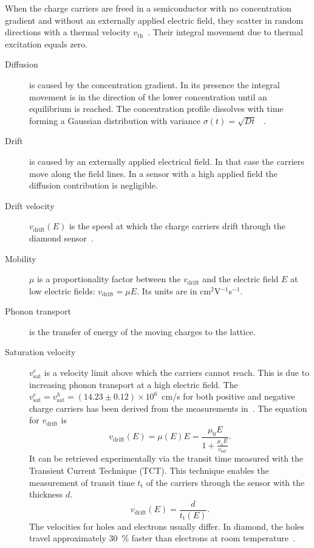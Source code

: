 When the charge carriers are freed in a semiconductor with no concentration gradient and without an externally applied electric field, they scatter in random directions with a thermal velocity $v_{\mathrm{th}}$~\cite{PHSEM:00000}. Their integral movement due to thermal excitation equals zero. 

\begin{description}

\item[Diffusion] is caused by the concentration gradient. In its presence the integral movement is in the direction of the lower concentration until an equilibrium is reached.
The concentration profile dissolves with time forming a Gaussian distribution with variance $\sigma(t)=\sqrt{Dt}$~\cite{PHSEM:00000} .

\item[Drift] is caused by an externally applied electrical field. In that case the carriers move along the field lines. In a sensor with a high applied field the diffusion contribution is negligible. 

\item[Drift velocity] $v_\mathrm{drift}(E)$ is the speed at which the charge carriers drift through the diamond sensor~\cite{PHSEM:00000}.

\item[Mobility] $\mu$ is a proportionality factor between the $v_\mathrm{drift}$ and the electric field $E$ at low electric fields: $v_\mathrm{drift} = \mu E$. Its units are in cm$^2$V$^{-1}$s$^{-1}$.

\item[Phonon transport] is the transfer of energy of the moving charges to the lattice.

\item[Saturation velocity] $v^e_\mathrm{sat}$ is a velocity limit above which the carriers cannot reach. This is due to increasing phonon transport at a high electric field. The $v^e_\mathrm{sat}=v^h_\mathrm{sat}=(14.23\pm0.12)\times10^6$~cm/s for both positive and negative charge carriers has been derived from the measurements in~\cite{JANSEN:00001}. The equation for $v_\mathrm{drift}$ is~\cite{VDRIFT:00000}
\begin{equation}
\label{eq:vsat}
v_\mathrm{drift}(E) = \mu(E)E= \frac{\mu_\mathrm{0} E}{1 + \frac{\mu_\mathrm{o} E}{v_\mathrm{sat}}}.
\end{equation}
It can be retrieved experimentally via the transit time measured with the Transient Current Technique (TCT). This technique enables the measurement of transit time $t_\mathrm{t}$ of the carriers through the sensor with the thickness $d$. 
\begin{equation}
\label{eq:vsat}
v_\mathrm{drift}(E) = \frac{d}{t_\mathrm{t}(E)}.
\end{equation}
The velocities for holes and electrons usually differ. In diamond, the holes travel approximately 30~\% faster than electrons at room temperature~\cite{Jansen:1956431}.


\end{description}

